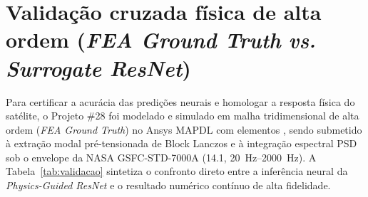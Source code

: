 \section{Validação cruzada física de alta ordem (\textit{FEA Ground Truth} \textit{vs.} \textit{Surrogate ResNet})}
\label{sec:validacao-fea}

Para certificar a acurácia das predições neurais e homologar a resposta física do satélite, o Projeto \#28 foi modelado e simulado em malha tridimensional de alta ordem (\textit{FEA Ground Truth}) no Ansys MAPDL com elementos , sendo submetido à extração modal pré-tensionada de Block Lanczos e à integração espectral PSD sob o envelope da NASA GSFC-STD-7000A (\SI{14.1}{\Grms}, \SIrange{20}{2000}{\hertz}). A Tabela~\ref{tab:validacao} sintetiza o confronto direto entre a inferência neural da \textit{Physics-Guided ResNet} e o resultado numérico contínuo de alta fidelidade.


